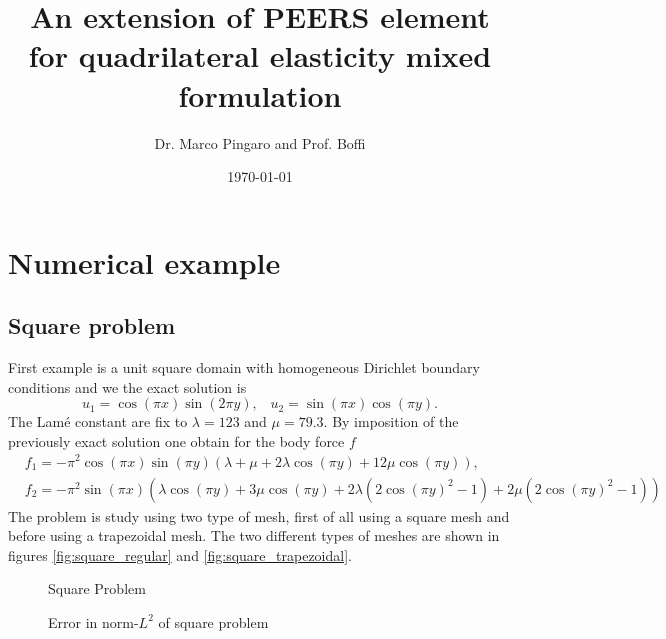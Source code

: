 \documentclass[a4paper,11pt]{article}
\title{\textbf{An extension of PEERS element for quadrilateral elasticity mixed formulation}}
\date{\today}
\author{Dr. Marco Pingaro and Prof. Boffi}
\begin{document}
\maketitle

\section{Numerical example}


\subsection{Square problem}
First example is a unit square domain with homogeneous Dirichlet boundary conditions and we the exact solution is
\begin{equation}\label{eq:exact_solution}
u_{1} = \cos (\pi x) \sin(2\pi y), \hspace{10pt} u_{2} = \sin(\pi x)\cos(\pi y).
\end{equation} 
The Lamé constant are fix to $\lambda = 123$ and $\mu=79.3$.
By imposition of the previously exact solution one obtain for the body force $f$
\begin{equation}
\begin{split}
&f_{1} = -\pi^{2} \cos(\pi x) \sin(\pi y) \left( \lambda + \mu + 2\lambda\cos(\pi y) + 
12\mu\cos(\pi y)\right), \\
&f_{2} = -\pi^{2}\sin(\pi x)\left( \lambda\cos(\pi y) + 3\mu\cos(\pi y) + 2\lambda\left(2\cos(\pi y)^{2} 
- 1\right) + 2\mu\left(2\cos(\pi y)^{2} - 1\right) \right)
\end{split}
\end{equation}
The problem is study using two type of mesh, first of all using a square mesh and before using a trapezoidal mesh.
The two different types of meshes are shown in figures \ref{fig:square_regular} and \ref{fig:square_trapezoidal}.
%
\begin{figure}[h!]
\begin{center}
\hspace{5pt}
\caption{Square Problem}
\end{center}
\end{figure}
%
\begin{figure}[h!]
\begin{center}
\caption{Error in norm-$L^{2}$ of square problem}
\end{center}
\end{figure}
\end{document}
